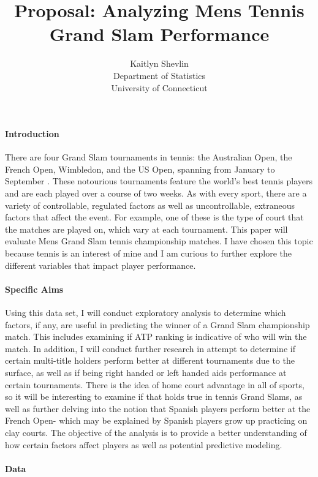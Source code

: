 \documentclass[12pt]{article}
\title{Proposal: Analyzing Mens Tennis Grand Slam Performance}
\author{Kaitlyn Shevlin\\
  Department of Statistics\\
  University of Connecticut
}
\begin{document}
\maketitle


\paragraph{Introduction}
There are four Grand Slam tournaments in tennis: the Australian Open, the French Open, Wimbledon, and the US Open, spanning from January to September \citet{Ifttennis2021Grand}. These notourious tournaments feature the world's best tennis players and are each played over a course of two weeks.  As with every sport, there are a variety of controllable, regulated factors as well as uncontrollable, extraneous factors that affect the event. For example, one of these is the type of court that the matches are played on, which vary at each tournament. This paper will evaluate Mens Grand Slam tennis championship matches. I have chosen this topic because tennis is an interest of mine and I am curious to further explore the different variables that impact player performance.

\paragraph{Specific Aims}
Using this data set, I will conduct exploratory analysis to determine which factors, if any, are useful in predicting the winner of a Grand Slam championship match. This includes examining if ATP ranking is indicative of who will win the match. In addition, I will conduct further research in attempt to determine if certain multi-title holders perform better at different tournaments due to the surface, as well as if being right handed or left handed aids performance at certain tournaments. There is the idea of home court advantage in all of sports, so it will be interesting to examine if that holds true in tennis Grand Slams, as well as further delving into the notion that Spanish players perform better at the French Open- which may be explained by Spanish players grow up practicing on clay courts. The objective of the analysis is to provide a better understanding of how certain factors affect players as well as potential predictive modeling.
 
\paragraph{Data}
\end{document}
